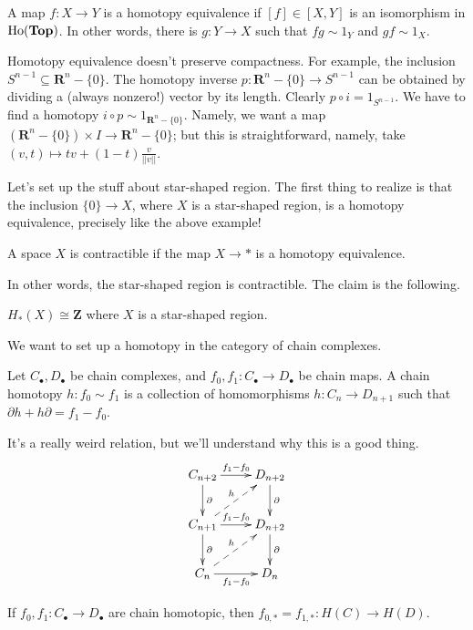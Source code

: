 \begin{definition}
A map $f:X\to Y$ is a homotopy equivalence if $[f]\in[X,Y]$ is an isomorphism in $\mathrm{Ho}(\mathbf{Top})$. In other words, there is $g:Y\to X$ such that $fg\sim 1_Y$ and $gf\sim 1_X$.
\end{definition}
\begin{example}
Homotopy equivalence doesn't preserve compactness. For example, the inclusion $S^{n-1}\subseteq \mathbf{R}^n-\{0\}$. The homotopy inverse $p:\mathbf{R}^n-\{0\}\to S^{n-1}$ can be obtained by dividing a (always nonzero!) vector by its length. Clearly $p\circ i=1_{S^{n-1}}$. We have to find a homotopy $i\circ p\sim 1_{\mathbf{R}^n-\{0\}}$. Namely, we want a map $(\mathbf{R}^n-\{0\})\times I\to \mathbf{R}^n-\{0\}$; but this is straightforward, namely, take $(v,t)\mapsto tv+(1-t)\frac{v}{||v||}$.
\end{example}
Let's set up the stuff about star-shaped region. The first thing to realize is that the inclusion $\{0\}\to X$, where $X$ is a star-shaped region, is a homotopy equivalence, precisely like the above example!
\begin{definition}
A space $X$ is contractible if the map $X\to\ast$ is a homotopy equivalence.
\end{definition}
In other words, the star-shaped region is contractible. The claim is the following.
\begin{prop}
$ H_\ast(X)\cong\mathbf{Z}$ where $X$ is a star-shaped region.
\end{prop}
We want to set up a homotopy in the category of chain complexes.
	\begin{definition}
	Let $C_\bullet,D_\bullet$ be chain complexes, and $f_0,f_1:C_\bullet\to D_\bullet$ be chain maps. A chain homotopy $h:f_0\sim f_1$ is a collection of homomorphisms $h:C_n\to D_{n+1}$ such that $\partial h+h\partial=f_1-f_0$.
	\end{definition}
It's a really weird relation, but we'll understand why this is a good thing.
			\begin{equation*}
			\xymatrix{C_{n+2}\ar[r]^{f_1-f_0}\ar[d]^\partial & D_{n+2}\ar[d]^\partial\\
			C_{n+1}\ar@{-->}[ur]^h\ar[r]^{f_1-f_0}\ar[d]^\partial & D_{n+2}\ar[d]^\partial\\
			C_n\ar@{-->}[ur]^h\ar[r]_{f_1-f_0} & D_n}
			\end{equation*}
	\begin{lemma}
	If $f_0,f_1:C_\bullet\to D_\bullet$ are chain homotopic, then $f_{0,\ast}=f_{1,\ast}: H(C)\to H(D)$.
	\end{lemma}
